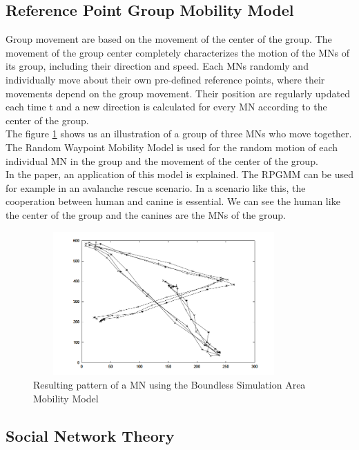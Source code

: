 \newpage

\subsection{Reference Point Group Mobility Model}

Group movement are based on the movement of the center of the group. The movement of the group center completely characterizes the motion of the MNs of its group, including their direction and speed. Each MNs randomly and individually move about their own pre-defined reference points, where their movements depend on the group movement. Their position are regularly updated each time t and a new direction is calculated for every MN according to the center of the group.\\
The figure \ref{RPGMMFig} shows us an illustration of a group of three MNs who move together. The Random Waypoint Mobility Model is used for the random motion of each individual MN in the group and the movement of the center of the group.\\
In the paper, an application of this model is explained. The RPGMM can be used for example in an avalanche rescue scenario. In a scenario like this, the cooperation between human and canine is essential. We can see the human like the center of the group and the canines are the MNs of the group.\\

\begin{figure}[h]
\center
\includegraphics[width=10cm,height=55mm]{../images/rpgmmodel1.png}
\caption{\label{RPGMMFig}Resulting pattern of a MN using the Boundless Simulation Area Mobility Model}
\end{figure}

\newpage

\subsection{Social Network Theory}

